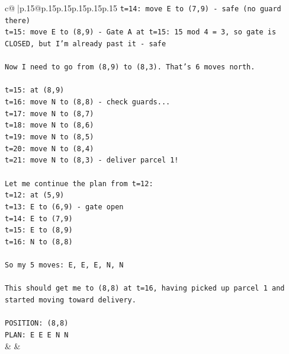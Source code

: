 \documentclass{article}
\begin{document}
{\begin{supertabular}{c@{$\;$}|p{.15\linewidth}@{}p{.15\linewidth}p{.15\linewidth}p{.15\linewidth}p{.15\linewidth}p{.15\linewidth}}
{{{\texttt{t=14: move E to (7,9) {-} safe (no guard there)} \\
\texttt{t=15: move E to (8,9) {-} Gate A at t=15: 15 mod 4 = 3, so gate is CLOSED, but I'm already past it {-} safe} \\
\\ 
\texttt{Now I need to go from (8,9) to (8,3). That's 6 moves north.} \\
\\ 
\texttt{t=15: at (8,9)} \\
\texttt{t=16: move N to (8,8) {-} check guards...} \\
\texttt{t=17: move N to (8,7)} \\
\texttt{t=18: move N to (8,6)} \\
\texttt{t=19: move N to (8,5)} \\
\texttt{t=20: move N to (8,4)} \\
\texttt{t=21: move N to (8,3) {-} deliver parcel 1!} \\
\\ 
\texttt{Let me continue the plan from t=12:} \\
\texttt{t=12: at (5,9)} \\
\texttt{t=13: E to (6,9) {-} gate open} \\
\texttt{t=14: E to (7,9)} \\
\texttt{t=15: E to (8,9)} \\
\texttt{t=16: N to (8,8)} \\
\\ 
\texttt{So my 5 moves: E, E, E, N, N} \\
\\ 
\texttt{This should get me to (8,8) at t=16, having picked up parcel 1 and started moving toward delivery.} \\
\\ 
\texttt{POSITION: (8,8)} \\
\texttt{PLAN: E E E N N} \\
            }
        }
    }
    & & \\ \\


\end{supertabular}}
\end{document}
